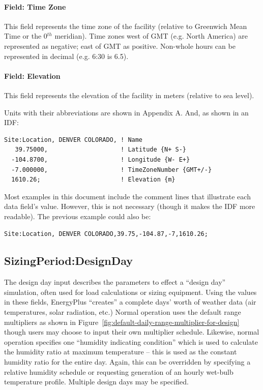 \paragraph{Field: Time Zone}\label{field-time-zone}

This field represents the time zone of the facility (relative to Greenwich Mean Time or the 0\(^{th}\) meridian). Time zones west of GMT (e.g. North America) are represented as negative; east of GMT as positive. Non-whole hours can be represented in decimal (e.g. 6:30 is 6.5).

\paragraph{Field: Elevation}\label{field-elevation}

This field represents the elevation of the facility in meters (relative to sea level).

Units with their abbreviations are shown in Appendix A. And, as shown in an IDF:

\begin{lstlisting}
Site:Location, DENVER COLORADO, ! Name
   39.75000,                    ! Latitude {N+ S-}
  -104.8700,                    ! Longitude {W- E+}
  -7.000000,                    ! TimeZoneNumber {GMT+/-}
  1610.26;                      ! Elevation {m}
\end{lstlisting}

Most examples in this document include the comment lines that illustrate each data field's value. However, this is not necessary (though it makes the IDF more readable). The previous example could also be:

\begin{lstlisting}
Site:Location, DENVER COLORADO,39.75,-104.87,-7,1610.26;
\end{lstlisting}

\subsection{SizingPeriod:DesignDay}\label{sizingperioddesignday}

The design day input describes the parameters to effect a ``design day'' simulation, often used for load calculations or sizing equipment. Using the values in these fields, EnergyPlus ``creates'' a complete days' worth of weather data (air temperatures, solar radiation, etc.) Normal operation uses the default range multipliers as shown in Figure~\ref{fig:default-daily-range-multiplier-for-design} though users may choose to input their own multiplier schedule. Likewise, normal operation specifies one ``humidity indicating condition'' which is used to calculate the humidity ratio at maximum temperature -- this is used as the constant humidity ratio for the entire day. Again, this can be overridden by specifying a relative humidity schedule or requesting generation of an hourly wet-bulb temperature profile. Multiple design days may be specified.

